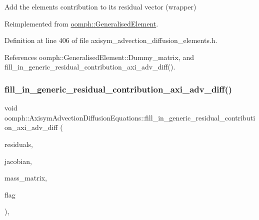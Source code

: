 Add the element\textquotesingle{}s contribution to its residual vector (wrapper) 



Reimplemented from \hyperlink{classoomph_1_1GeneralisedElement_a310c97f515e8504a48179c0e72c550d7}{oomph\+::\+Generalised\+Element}.



Definition at line 406 of file axisym\+\_\+advection\+\_\+diffusion\+\_\+elements.\+h.



References oomph\+::\+Generalised\+Element\+::\+Dummy\+\_\+matrix, and fill\+\_\+in\+\_\+generic\+\_\+residual\+\_\+contribution\+\_\+axi\+\_\+adv\+\_\+diff().

\mbox{\label{classoomph_1_1AxisymAdvectionDiffusionEquations_a19bf92fed341de2d09b444b3ab71096e}} 
\subsubsection{\texorpdfstring{fill\+\_\+in\+\_\+generic\+\_\+residual\+\_\+contribution\+\_\+axi\+\_\+adv\+\_\+diff()}{fill\_in\_generic\_residual\_contribution\_axi\_adv\_diff()}}
{\footnotesize\ttfamily void oomph\+::\+Axisym\+Advection\+Diffusion\+Equations\+::fill\+\_\+in\+\_\+generic\+\_\+residual\+\_\+contribution\+\_\+axi\+\_\+adv\+\_\+diff (\begin{DoxyParamCaption}\item[{\hyperlink{classoomph_1_1Vector}{Vector}$<$ double $>$ \&}]{residuals,  }\item[{\hyperlink{classoomph_1_1DenseMatrix}{Dense\+Matrix}$<$ double $>$ \&}]{jacobian,  }\item[{\hyperlink{classoomph_1_1DenseMatrix}{Dense\+Matrix}$<$ double $>$ \&}]{mass\+\_\+matrix,  }\item[{unsigned}]{flag }\end{DoxyParamCaption})\hspace{0.3cm}{\ttfamily [protected]}, {\ttfamily [virtual]}}



